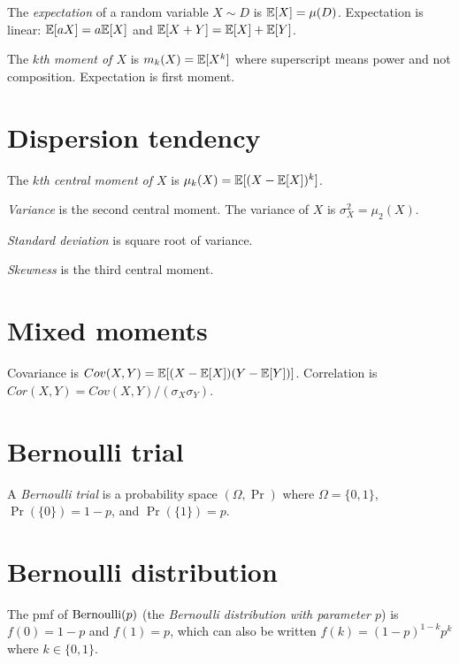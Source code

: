 %
The \emph{expectation} of a random variable \(X \sim D\) is \(\mathbb{E}[X] = \mu(D)\).
%
%
Expectation is linear:
\(\mathbb{E}[aX] = a \mathbb{E}[X]\) and
\(\mathbb{E}[X+Y] = \mathbb{E}[X] + \mathbb{E}[Y]\).

%
The \emph{\(k\)th moment of \(X\)} is \(m_k(X) = \mathbb{E}[X^k]\)
where superscript means power and not composition.
Expectation is first moment.

\section{Dispersion tendency}

%
The \emph{\(k\)th central moment of \(X\)} is \(\mu_k(X) = \mathbb{E}[(X - \mathbb{E}[X])^k]\).

%
\emph{Variance} is the second central moment.
The variance of \(X\) is \(\sigma_X^2 = \mu_2(X)\).

%
\emph{Standard deviation} is square root of variance.

%
\emph{Skewness} is the third central moment.

\section{Mixed moments}

Covariance is \(Cov(X,Y) = \mathbb{E}[(X-\mathbb{E}[X])(Y-\mathbb{E}[Y])]\).
Correlation is \(Cor(X,Y) = Cov(X,Y) / (\sigma_X \sigma_Y)\).

\section{Bernoulli trial}

%
A \emph{Bernoulli trial}
is a probability space \((\Omega,\Pr)\) where \(\Omega = \{0,1\}\),
\(\Pr(\{0\}) = 1 - p\), and \(\Pr(\{1\}) = p\).

\section{Bernoulli distribution}

%
%
The pmf of \(\text{Bernoulli}(p)\) (the \emph{Bernoulli distribution with parameter \(p\)})
is \(f(0) = 1 - p\) and \(f(1) = p\),
which can also be written \(f(k) = (1-p)^{1-k} p^k\) where \(k \in \{0,1\}\).

